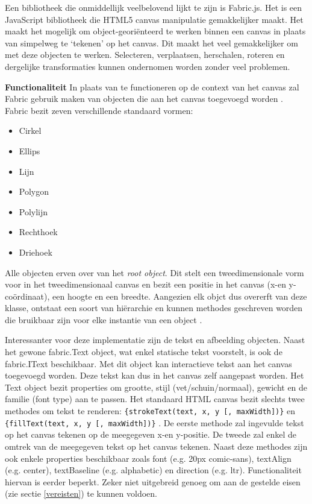 Een bibliotheek die onmiddellijk veelbelovend lijkt te zijn is Fabric.js. Het is een JavaScript bibliotheek die HTML5 canvas manipulatie gemakkelijker maakt. Het maakt het mogelijk om object-geori\"{e}nteerd te werken binnen een canvas in plaats van simpelweg te `tekenen' op het canvas. Dit maakt het veel gemakkelijker om met deze objecten te werken. Selecteren, verplaatsen, herschalen, roteren en dergelijke transformaties kunnen ondernomen worden zonder veel problemen. 

\textbf{Functionaliteit} \break 
In plaats van te functioneren op de context van het canvas zal Fabric gebruik maken van objecten die aan het canvas toegevoegd worden \cite{FabricJSDocs}. Fabric bezit zeven verschillende standaard vormen: 

\begin{itemize}
	\item Cirkel
	\item Ellips
	\item Lijn
	\item Polygon
	\item Polylijn
	\item Rechthoek
	\item Driehoek
\end{itemize}

Alle objecten erven over van het \textit{root object}. Dit stelt een tweedimensionale vorm voor in het tweedimensionaal canvas en bezit een positie in het canvas (x-en y-co\"{o}rdinaat), een hoogte en een breedte. Aangezien elk objct dus overerft van deze klasse, ontstaat een soort van hi\"{e}rarchie en kunnen methodes geschreven worden die bruikbaar zijn voor elke instantie van een object \cite{FabricJSIntro}. 

Interessanter voor deze implementatie zijn de tekst en afbeelding objecten. Naast het gewone fabric.Text object, wat enkel statische tekst voorstelt, is ook de fabric.IText beschikbaar. Met dit object kan interactieve tekst aan het canvas toegevoegd worden. Deze tekst kan dus in het canvas zelf aangepast worden. Het Text object bezit properties om grootte, stijl (vet/schuin/normaal), gewicht en de familie (font type) aan te passen. Het standaard HTML canvas bezit slechts twee methodes om tekst te renderen: \lstinline|{strokeText(text, x, y [, maxWidth])}| en \lstinline|{fillText(text, x, y [, maxWidth])}| \cite{MozillaCanvas-DrawingText}. De eerste methode zal ingevulde tekst op het canvas tekenen op de meegegeven x-en y-positie. De tweede zal enkel de omtrek van de meegegeven tekst op het canvas tekenen. Naast deze methodes zijn ook enkele properties beschikbaar zoals font (e.g. 20px comic-sans), textAlign (e.g. center), textBaseline (e.g. alphabetic) en direction (e.g. ltr). Functionaliteit hiervan is eerder beperkt. Zeker niet uitgebreid genoeg om aan de gestelde eisen (zie sectie \ref{vereisten}) te kunnen voldoen. 

